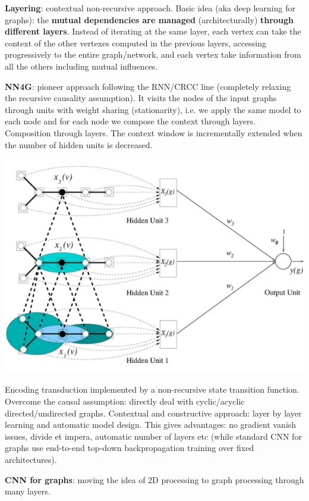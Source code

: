 \documentclass[10pt]{report}
\begin{document}
\begin{list}{}{}
\begin{list}{}{}
\begin{center}
		\end{center}
	\end{list}
	\item \textbf{Layering}: contextual non-recursive approach. Basic idea (aka deep learning for graphs): the \textbf{mutual dependencies are managed} (architecturally) \textbf{through different layers}. Instead of iterating at the same layer, each vertex can take the context of the other vertexes computed in the previous layers, accessing progressively to the entire graph/network, and each vertex take information from all the others including mutual influences.\begin{list}{}{}
		\item \textbf{NN4G}: pioneer approach following the RNN/CRCC line (completely relaxing the recursive causality assumption). It visits the nodes of the input graphs through units with weight sharing (stationarity), i.e. we apply the same model to each node and for each node we compose the context through layers.\\
		Composition through layers. The context window is incrementally extended when the number of hidden units is decreased.
		\begin{center}
			\includegraphics[scale=0.5]{48.png}
		\end{center}
		Encoding transduction implemented by a non-recursive state transition function. Overcome the causal assumption: directly deal with cyclic/acyclic directed/undirected graphs. Contextual and constructive approach: layer by layer learning and automatic model design. This gives advantages: no gradient vanish issues, divide et impera, automatic number of layers etc (while standard CNN for graphs use end-to-end top-down backpropagation training over fixed architectures).
		\item \textbf{CNN for graphs}: moving the idea of 2D processing to graph processing through many layers.
	\end{list}
\end{list}
\end{document}

